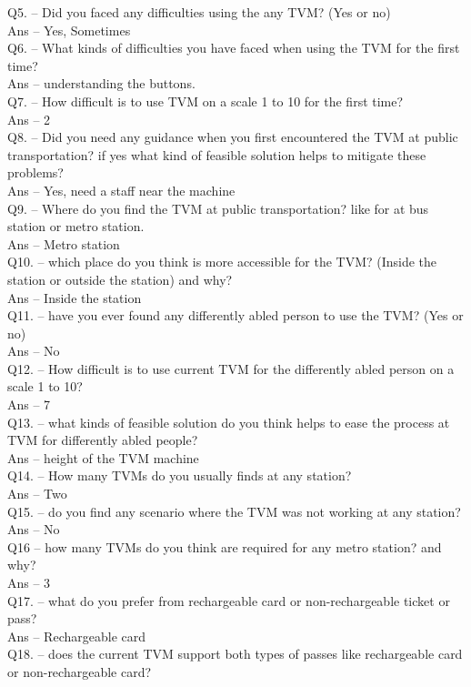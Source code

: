 \documentclass[a4paper, 11pt]{report}
\begin{document}
Q5. – Did you faced any difficulties using the any TVM? (Yes or no) \\
Ans – Yes, Sometimes\\
Q6. – What kinds of difficulties you have faced when using the TVM for the first time? \\
Ans – understanding the buttons. \\
Q7. – How difficult is to use TVM on a scale 1 to 10 for the first time? \\
Ans – 2\\
Q8. – Did you need any guidance when you first encountered the TVM at public transportation? if yes what kind of feasible solution helps to mitigate these problems? \\
Ans – Yes, need a staff near the machine\\
Q9. – Where do you find the TVM at public transportation? like for at bus station or metro station. \\
Ans – Metro station\\
Q10. – which place do you think is more accessible for the TVM? (Inside the station or outside the station) and why? \\
Ans – Inside the station \\
Q11. – have you ever found any differently abled person to use the TVM? (Yes or no) \\
Ans – No\\
Q12. – How difficult is to use current TVM for the differently abled person on a scale 1 to 10? \\
Ans – 7\\
Q13. – what kinds of feasible solution do you think helps to ease the process at TVM for differently abled people? \\
Ans – height of the TVM machine  \\
Q14. – How many TVMs do you usually finds at any station? \\
Ans – Two \\
Q15. – do you find any scenario where the TVM was not working at any station? \\
Ans – No\\
Q16 – how many TVMs do you think are required for any metro station? and why? \\
Ans – 3\\
Q17. – what do you prefer from rechargeable card or non-rechargeable ticket or pass? \\
Ans – Rechargeable card\\
Q18. – does the current TVM support both types of passes like rechargeable card or non-rechargeable card? \\
\end{document}
